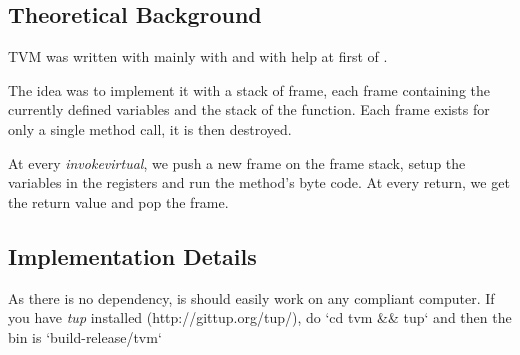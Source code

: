 %
%
%

\subsection{Theoretical Background}
TVM was written with mainly with \cite{Spec} and with help at first of
\cite{Wiki}.

The idea was to implement it with a stack of frame, each frame containing the
currently defined variables and the stack of the function. Each frame exists for
only a single method call, it is then destroyed.

At every \emph{invokevirtual}, we push a new frame on the frame stack, setup the
variables in the registers and run the method's byte code. At every return, we
get the return value and pop the frame.

\subsection{Implementation Details}
As there is no dependency, is should easily work on any compliant computer.
If you have \emph{tup} installed (http://gittup.org/tup/), do
`cd tvm \&\& tup` and then the bin is `build-release/tvm`


